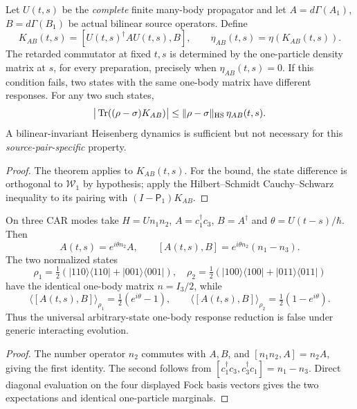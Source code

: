 \documentclass[12pt,a4paper]{article}
\begin{document}
\begin{corollary}
\label{p4b:cor:v347-retarded-criterion}
Let \(U(t,s)\) be the \emph{complete} finite many-body propagator and
let \(A=d\Gamma(A_1)\), \(B=d\Gamma(B_1)\) be actual bilinear source
operators.  Define
\[
 K_{AB}(t,s)=[U(t,s)^\dagger A U(t,s),B],\qquad
 \eta_{AB}(t,s)=\eta(K_{AB}(t,s)).
\]
The retarded commutator at fixed \(t,s\) is determined by the
one-particle density matrix at \(s\), for every preparation, precisely
when \(\eta_{AB}(t,s)=0\).  If this condition fails, two states with the
same one-body matrix have different responses.  For any two such states,
\[
 \big|\operatorname{Tr}((\rho-\sigma)K_{AB})\big|
 \le\|\rho-\sigma\|_{\rm HS}\,\eta_{AB}(t,s).
\]
A bilinear-invariant Heisenberg dynamics is sufficient but not
necessary for this \emph{source-pair-specific} property.
\end{corollary}
\begin{proof}
The theorem applies to \(K_{AB}(t,s)\).  For the bound, the state
difference is orthogonal to \(\mathscr W_1\) by hypothesis; apply the
Hilbert--Schmidt Cauchy--Schwarz inequality to its pairing with
\((I-\mathsf P_1)K_{AB}\).
\end{proof}

\begin{proposition}
\label{p4b:prop:v347-three-mode-response-obstruction}
On three CAR modes take \(H=Un_1n_2\),
\(A=c_1^\dagger c_3\), \(B=A^\dagger\) and
\(\theta=U(t-s)/\hbar\).  Then
\[
 A(t,s)=e^{i\theta n_2}A,\qquad
 [A(t,s),B]=e^{i\theta n_2}(n_1-n_3).
\]
The two normalized states
\[
 \rho_1=\tfrac12(|110\rangle\langle110|+|001\rangle\langle001|),
 \quad
 \rho_2=\tfrac12(|100\rangle\langle100|+|011\rangle\langle011|)
\]
have the identical one-body matrix \(n=I_3/2\), while
\[
 \langle[A(t,s),B]\rangle_{\rho_1}
 =\tfrac12(e^{i\theta}-1),\qquad
 \langle[A(t,s),B]\rangle_{\rho_2}
 =\tfrac12(1-e^{i\theta}).
\]
Thus the universal arbitrary-state one-body response reduction is
false under generic interacting evolution.
\end{proposition}
\begin{proof}
The number operator \(n_2\) commutes with \(A,B\), and
\([n_1n_2,A]=n_2A\), giving the first identity.  The second follows
from \([c_1^\dagger c_3,c_3^\dagger c_1]=n_1-n_3\).  Direct diagonal
evaluation on the four displayed Fock basis vectors gives the two
expectations and identical one-particle marginals.
\end{proof}
\end{document}
